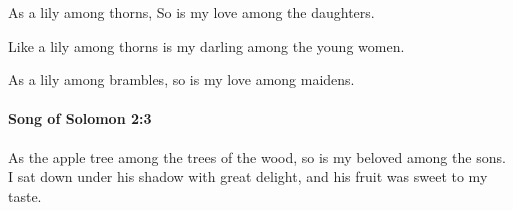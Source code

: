 			\begin{versebox}
					\item[BHS] 
					\item[LXX] 
					\item[ASV] As a lily among thorns, So is my love among the daughters.
					\item[NIV] Like a lily among thorns is my darling among the young women.
					\item[NRSV] As a lily among brambles, so is my love among maidens.
			\end{versebox}

		\paragraph{Song of Solomon 2:3} %
			\label{SONGOFSOLOMON-2-3}

			As the apple tree among the trees of the wood, so is my beloved among the sons. I sat down under his shadow with great delight, and his fruit was sweet to my taste.

